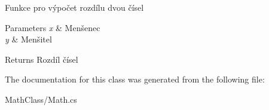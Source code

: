Funkce pro výpočet rozdílu dvou čísel 


\begin{DoxyParams}{Parameters}
{\em x} & Menšenec\\
\hline
{\em y} & Menšitel\\
\hline
\end{DoxyParams}
\begin{DoxyReturn}{Returns}
Rozdíl čísel
\end{DoxyReturn}


The documentation for this class was generated from the following file\+:\begin{DoxyCompactItemize}
\item 
Math\+Class/Math.\+cs\end{DoxyCompactItemize}
